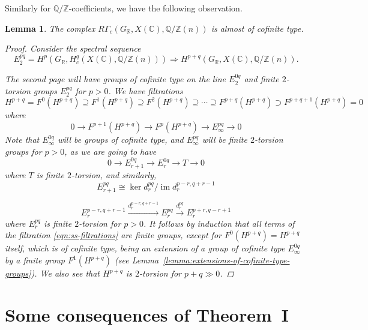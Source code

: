 \documentclass{article}
\DeclareMathOperator{\im}{im}
\newcommand{\CC}{\mathbb{C}}
\newcommand{\QQ}{\mathbb{Q}}
\newcommand{\RR}{\mathbb{R}}
\newcommand{\ZZ}{\mathbb{Z}}
\newtheorem{lemma}[theorem]{Lemma}
\theoremstyle{definition}
\numberwithin{equation}{section}
\begin{document}
Similarly for $\QQ/\ZZ$-coefficients, we have the following observation.

\begin{lemma}
  \label{lemma:RGammac(GR,X(C),Q/Z(n))-almost-cofinite-type}
  The complex $R\Gamma_c (G_\RR, X (\CC), \QQ/\ZZ (n))$
  is almost of cofinite type.

  \begin{proof}
    Consider the spectral sequence
    \[ E_2^{pq} = H^p (G_\RR, H^q_c (X (\CC), \QQ/\ZZ (n)))
    \Longrightarrow
    H^{p+q} (G_\RR, X (\CC), \QQ/\ZZ (n)). \]

    The second page will have groups of cofinite type on the line $E_2^{0q}$ and
    finite $2$-torsion groups $E_2^{pq}$ for $p > 0$. We have filtrations
    \begin{equation}
      \label{eqn:ss-filtrations}
      H^{p+q} = F^0 (H^{p+q}) \supseteq
      F^1 (H^{p+q}) \supseteq
      F^2 (H^{p+q}) \supseteq \cdots \supseteq
      F^{p+q} (H^{p+q}) \supset F^{p+q+1} (H^{p+q}) = 0
    \end{equation}
    where
    $$0 \to F^{p+1} (H^{p+q}) \to F^p (H^{p+q}) \to E_\infty^{pq} \to 0$$
    Note that $E^{0q}_\infty$ will be groups of cofinite type, and
    $E^{pq}_\infty$ will be finite $2$-torsion groups for $p > 0$, as we are
    going to have
    $$0 \to E_{r+1}^{0q} \to E_r^{0q} \to T \to 0$$
    where $T$ is finite $2$-torsion, and similarly,
    $$E_{r+1}^{pq} \cong \ker d_r^{pq} / \im d_r^{p-r,q+r-1}$$

    \[ E_r^{p-r,q+r-1} \xrightarrow{d_r^{p-r,q+r-1}}
    E_r^{pq} \xrightarrow{d_r^{pq}} E_r^{p+r,q-r+1} \]
    where $E_r^{pq}$ is finite $2$-torsion for $p > 0$. It follows by induction
    that all terms of the filtration \eqref{eqn:ss-filtrations} are finite
    groups, except for $F^0 (H^{p+q}) = H^{p+q}$ itself, which is of cofinite
    type, being an extension of a group of cofinite type $E_\infty^{0q}$ by a
    finite group $F^1 (H^{p+q})$ (see
    Lemma~\ref{lemma:extensions-of-cofinite-type-groups}). We also see that
    $H^{p+q}$ is $2$-torsion for $p+q \gg 0$.
  \end{proof}
\end{lemma}


\section{Some consequences of Theorem~I}
\label{sec:consequences-of-theorem-I}
\end{document}
